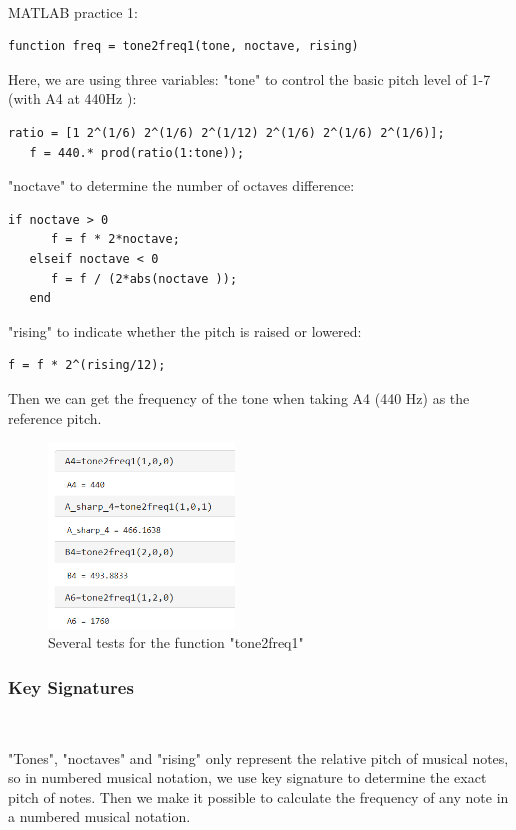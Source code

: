 \documentclass[journal]{IEEEtran}
\begin{document}
$~$

\textcolor[rgb]{0,0.6,1}{MATLAB practice 1:}

\begin{lstlisting}[style=Matlab-editor]
   function freq = tone2freq1(tone, noctave, rising)
\end{lstlisting}

Here, we are using three variables: "tone" to control the basic pitch level of 1-7 (with A4 at 440Hz ):
\begin{lstlisting}[style=Matlab-editor]
   ratio = [1 2^(1/6) 2^(1/6) 2^(1/12) 2^(1/6) 2^(1/6) 2^(1/6)];
   f = 440.* prod(ratio(1:tone));
\end{lstlisting}
 "noctave" to determine the number of octaves difference:
 \begin{lstlisting}[style=Matlab-editor]
   if noctave > 0
      f = f * 2*noctave;
   elseif noctave < 0
      f = f / (2*abs(noctave ));
   end
\end{lstlisting}
 "rising" to indicate whether the pitch is raised or lowered:
 \begin{lstlisting}[style=Matlab-editor]
   f = f * 2^(rising/12);
\end{lstlisting}
Then we can get the frequency of the tone when taking A4 (440 Hz) as the reference pitch.

\begin{figure}[htbp]
   \centering
   \includegraphics[width=0.44\textwidth]{p1.png} 
   \caption{Several tests for the function "tone2freq1"}
   \label{fig:1}
   \end{figure}

\subsubsection{Key Signatures}
$~~~~~~$

"Tones", "noctaves" and "rising" only represent the relative pitch of musical notes, so in numbered musical notation, we use key signature to determine the exact pitch of notes.
Then we make it possible to calculate the frequency of any note in a numbered musical notation.
\end{document}
